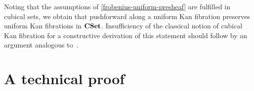 \documentclass[reqno,10pt,a4paper,oneside,draft]{amsart}
\begin{document}
\begin{example}
Noting that the assumptions of \cref{frobenius-uniform-presheaf} are fulfilled in cubical sets, we obtain that pushforward along a uniform Kan fibration preserves uniform Kan fibrations in $\mathbf{CSet}$.
Insufficiency of the classical notion of cubical Kan fibration for a constructive derivation of this statement should follow by an argument analogous to~\cite{coquand-non-constructivity-kan}.
\end{example}


\appendix

\section{A technical proof}
\label{app:tecp}
\end{document}
